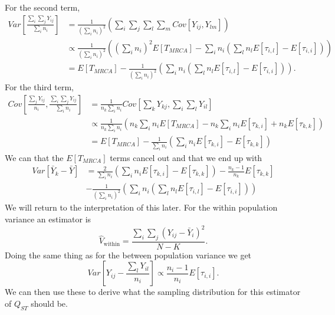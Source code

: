 For the second term,
\begin{align}
  Var[\frac{\sum_i\sum_jY_{ij}}{\sum_in_i}] &= \frac{1}{(\sum_in_i)^2} \left( \sum_i\sum_j\sum_l\sum_m Cov[Y_{ij},Y_{lm} ]\right) \nonumber \\
                                            &\propto \frac{1}{(\sum_in_i)^2} \left( \left(\sum_i n_i\right)^2 E[T_{MRCA}] - \sum_in_i\left(\sum_ln_lE[\tau_{i,l}] - E[\tau_{i,i}]\right) \right) \nonumber \\
                                            &= E[T_{MRCA}] - \frac{1}{(\sum_in_i)^2} \left(\sum_in_i\left(\sum_ln_lE[\tau_{i,l}] - E[\tau_{i,i}]\right) \right).
\end{align}
For the third term,
\begin{align}
  Cov[\frac{\sum_jY_{ij}}{n_i}, \frac{\sum_i\sum_jY_{ij}}{\sum_in_i}] &= \frac{1}{n_k\sum_in_i}Cov[\sum_kY_{kj},\sum_i\sum_lY_{il}] \nonumber \\
                                                                      &\propto \frac{1}{n_k\sum_in_i} \left( n_k\sum_in_iE[T_{MRCA}] - n_k\sum_in_iE[\tau_{k,i}] + n_kE[\tau_{k,k}] \right) \nonumber \\
                                                                      &=  E[T_{MRCA}] - \frac{1}{\sum_i n_i} \left( \sum_i n_i E[\tau_{k,i}] - E[\tau_{k,k}] \right)
\end{align}
We can that the $E[T_{MRCA}]$ terms cancel out and that we end up with 
\begin{align}
  \label{eq:diffvar}
  Var[\bar{Y}_k-\bar{Y}] &= \frac{2}{\sum_i n_i} \left( \sum_i n_i E[\tau_{k,i}] - E[\tau_{k,k}] \right) - \frac{n_k-1}{n_k}E[\tau_{k,k}] \nonumber \\
                         &- \frac{1}{(\sum_in_i)^2} \left(\sum_in_i\left(\sum_ln_lE[\tau_{i,l}] - E[\tau_{i,i}]\right)\right)
\end{align}
We will return to the interpretation of this later. For the within population variance an estimator is 
\begin{equation}
  \label{eq:within}
  \hat{V}_{\text{within}}=\frac{\sum_i\sum_j(Y_{ij}-\bar{Y}_i)^2}{N-K}.
\end{equation}
Doing the same thing as for the between population variance we get
\begin{equation}
  \label{eq:withinprop}
  Var[Y_{ij} - \frac{\sum_lY_{il}}{n_i}] \propto \frac{n_i-1}{n_i}E[\tau_{i,i}].
\end{equation}
We can then use these to derive what the sampling distribution for this estimator of $Q_{ST}$ should be. 
